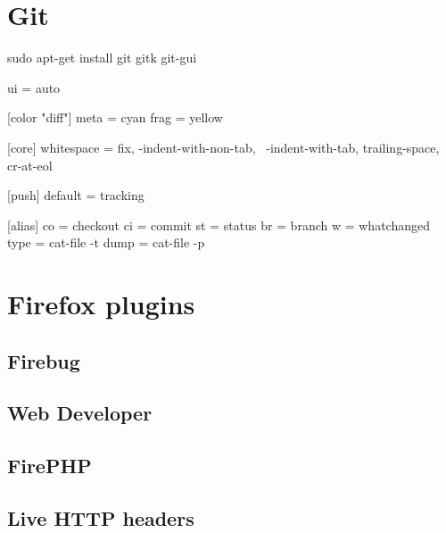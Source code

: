 \documentclass[final,ebook,10pt,twoside,openright]{memoir}
\begin{document}
\section{Git}
\label{sec:Git}

\begin{squashboxcommand}
sudo apt-get install git gitk git-gui
\end{squashboxcommand}

\begin{squashboxoutput}
[color]
ui = auto

[color "diff"]
meta = cyan
frag = yellow

[core]
whitespace = fix, -indent-with-non-tab, \
  -indent-with-tab, trailing-space, cr-at-eol

[push]
default = tracking

[alias]
co = checkout
ci = commit
st = status
br = branch
w = whatchanged
type = cat-file -t
dump = cat-file -p
\end{squashboxoutput}



\section{Firefox plugins}
\label{sec:Firefox plugins}

\subsection{Firebug}

\subsection{Web Developer}

\subsection{FirePHP}

\subsection{Live \textsc{HTTP} headers}
\end{document}
